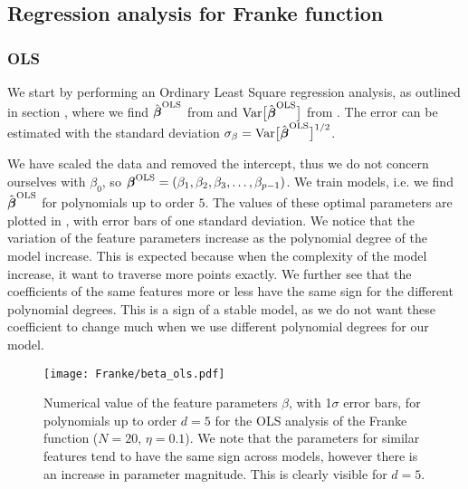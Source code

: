     \subsection{Regression analysis for Franke function}\label{sec:reganalysis_franke}

        \subsubsection{OLS}\label{sec:olsanalysis}
            We start by performing an Ordinary Least Square regression analysis, as outlined in section , where we find $\hat{\boldsymbol{\beta}}^\text{OLS}$ from  and $\text{Var}\big[\hat{\boldsymbol{\beta}}^{\text{OLS}}\big]$ from . The error can be estimated with the standard deviation $\mathbf{\sigma}_{\beta} = \text{Var}\big[\hat{\boldsymbol{\beta}}^{\text{OLS}}\big]^{1/2}$. 

            We have scaled the data and removed the intercept, thus we do not concern ourselves with $\beta_0$, so $\boldsymbol{\beta}^{\text{OLS}} = (\beta_1, \beta_2, \beta_3, \dots, \beta_{p-1})$. We train models, i.e. we find $\hat{\boldsymbol{\beta}}^{\text{OLS}}$ for polynomials up to order $5$. The values of these optimal parameters are plotted in , with error bars of one standard deviation. We notice that the variation of the feature parameters increase as the polynomial degree of the model increase. This is expected because when the complexity of the model increase, it want to traverse more points exactly. We further see that the coefficients of the same features more or less have the same sign for the different polynomial degrees. This is a sign of a stable model, as we do not want these coefficient to change much when we use different polynomial degrees for our model.

            \begin{figure}
                \texttt{[image: Franke/beta\_ols.pdf]}
                \caption{Numerical value of the feature parameters $\beta$, with 1$\sigma$ error bars, for polynomials up to order $d=5$ for the OLS analysis of the Franke function ($N=20$, $\eta=0.1$). We note that the parameters for similar features tend to have the same sign across models, however there is an increase in parameter magnitude. This is clearly visible for $d=5$. }
                \label{fig:beta_with_standard_deviation}
            \end{figure}

